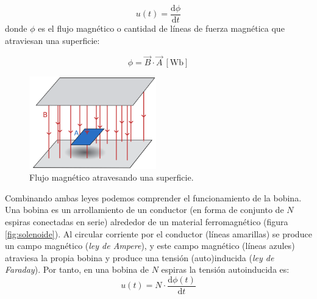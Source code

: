 \[
u(t) = \frac{\mathrm{d}\phi}{\mathrm{d}t} 
\]
donde $\phi$ es el flujo magnético o cantidad de líneas de fuerza magnética que atraviesan una superficie:

\[
\phi = \vec{B} \cdot \vec{A} \ [\mathrm{Wb}]
\]

\begin{figure}[H]
  \centering
  \includegraphics[height=4cm]{../figs/flujo_magnetico.pdf}
  \caption{Flujo magnético atravesando una superficie.}
  \label{fig:flujo-magnetico}
\end{figure}

Combinando ambas leyes podemos comprender el funcionamiento de la
bobina. Una bobina es un arrollamiento de un conductor (en forma de
conjunto de $N$ espiras conectadas en serie) alrededor de un material
ferromagnético (figura \ref{fig:solenoide}). Al circular corriente por
el conductor (líneas amarillas) se produce un campo magnético
(\emph{ley de Ampere}), y este campo magnético (líneas azules)
atraviesa la propia bobina y produce una tensión (auto)inducida
(\emph{ley de Faraday}). Por tanto, en una bobina de $N$ espiras la
tensión autoinducida es:
\[
u(t) = N \cdot \frac{\mathrm{d}\phi(t)}{\mathrm{d} t}
\]

